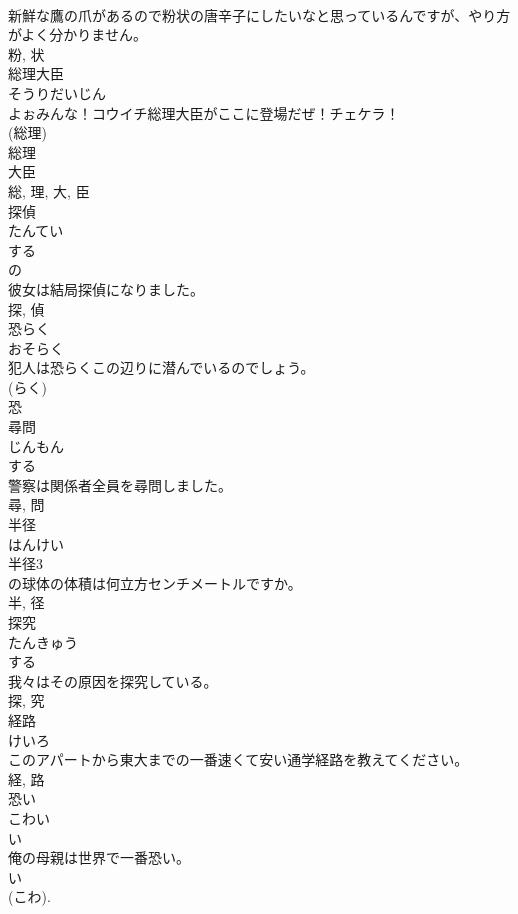 \documentclass[8pt]{extreport}
\begin{document}
\begin{CJK}{UTF8}{min}
\\	新鮮な鷹の爪があるので粉状の唐辛子にしたいなと思っているんですが、やり方がよく分かりません。	
\\	粉, 状	
\\	総理大臣	
\\	そうりだいじん	
\\	よぉみんな！コウイチ総理大臣がここに登場だぜ！チェケラ！	
\\	(総理) 
\\	総理 
\\	大臣 
\\	総, 理, 大, 臣	
\\	探偵	
\\	たんてい	
\\	する 
\\	の 
\\	彼女は結局探偵になりました。	
\\	探, 偵	
\\	恐らく	
\\	おそらく	
\\	犯人は恐らくこの辺りに潜んでいるのでしょう。	
\\	(らく) 
\\	恐	
\\	尋問	
\\	じんもん	
\\	する 
\\	警察は関係者全員を尋問しました。	
\\	尋, 問	
\\	半径	
\\	はんけい	
\\	半径3
\\	の球体の体積は何立方センチメートルですか。	
\\	半, 径	
\\	探究	
\\	たんきゅう	
\\	する 
\\	我々はその原因を探究している。	
\\	探, 究	
\\	経路	
\\	けいろ	
\\	このアパートから東大までの一番速くて安い通学経路を教えてください。	
\\	経, 路	
\\	恐い	
\\	こわい	
\\	い 
\\	俺の母親は世界で一番恐い。	
\\	い 
\\	(こわ). 

\end{CJK}
\end{document}
